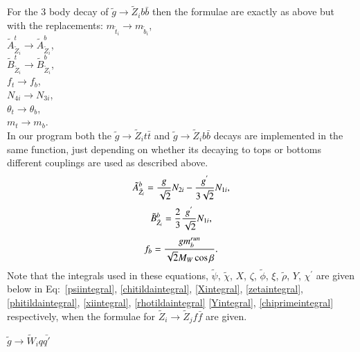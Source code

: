 \documentclass[final,3p,times,pdflatex]{elsarticle}
\begin{document}
For the 3 body decay of $\tilde{g} \rightarrow \tilde{Z}_i b \bar{b}$ then the formulae are exactly as above but with the replacements:
{\centering
$m_{\tilde{t}_{i}} \rightarrow m_{\tilde{b}_{i}}$, \\
$\tilde{A}^{t}_{\tilde{Z}_{i}} \rightarrow \tilde{A}^{b}_{\tilde{Z}_{i}}$, \\
$\tilde{B}^{t}_{\tilde{Z}_{i}} \rightarrow \tilde{B}^{b}_{\tilde{Z}_{i}}$, \\
$f_{t} \rightarrow f_{b}$, \\
$N_{4i} \rightarrow N_{3i}$, \\
$\theta_t \rightarrow \theta_b$, \\
$m_{t} \rightarrow m_{b}$. \\
}
In our program both the $\tilde{g} \rightarrow \tilde{Z}_i t \bar{t}$ and $\tilde{g} \rightarrow \tilde{Z}_i b \bar{b}$ decays are implemented in the same function, just depending on whether its decaying to tops or bottoms different couplings are used as described above.
\begin{equation} 
\tilde{A}^{b}_{\tilde{Z}_i} = {g \over \sqrt{2}}N_{2i} - {g^{'} \over 3 \sqrt{2}}N_{1i},
\end{equation}
\begin{equation}
\tilde{B}^{b}_{\tilde{Z}_i} = {2 \over 3}{g^{'} \over \sqrt{2}}N_{1i},
\end{equation}
\begin{equation}
f_{b} = {g m_{b}^{run} \over \sqrt{2} M_{W} \cos\beta}.
\end{equation}
Note that the integrals used in these equations, $\tilde{\psi}$, $\tilde{\chi}$, $X$, $\zeta$, $\tilde{\phi}$, $\xi$,  $\tilde{\rho}$, $Y$, $\chi^{'}$ are given below in Eq:~\eqref{psiintegral}, \eqref{chitildaintegral}, \eqref{Xintegral}, \eqref{zetaintegral}, \eqref{phitildaintegral}, \eqref{xiintegral}, \eqref{rhotildaintegral} \eqref{Yintegral}, \eqref{chiprimeintegral} respectively, when the formulae for $\tilde{Z}_i \rightarrow \tilde{Z}_j f \bar{f}$ are given.

\textbf{\underline{$\tilde{g} \rightarrow \tilde{W}_i q \bar{q'}$}}
\end{document}
